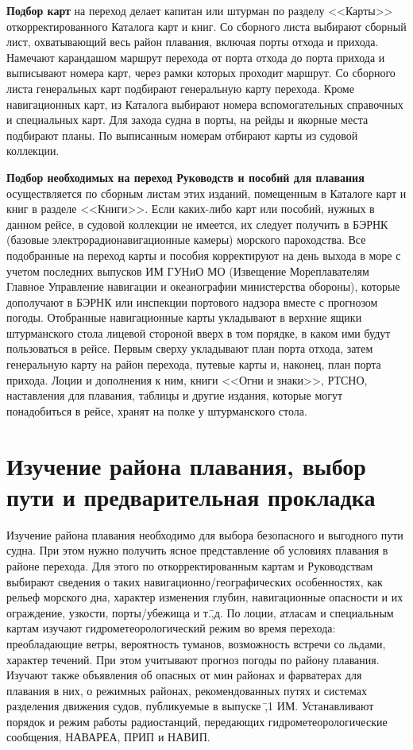 \textbf{Подбор карт} на переход делает капитан или штурман по разделу
<<Карты>> откорректированного Каталога карт и книг. Со сборного листа
выбирают сборный лист, охватывающий весь район плавания, включая порты
отхода и прихода. Намечают карандашом маршрут перехода от порта отхода
до порта прихода и выписывают номера карт, через рамки которых
проходит маршрут. Со сборного листа генеральных карт подбирают
генеральную карту перехода. Кроме навигационных карт, из Каталога
выбирают номера вспомогательных справочных и специальных карт. Для
захода судна в порты, на рейды и якорные места подбирают планы. По
выписанным номерам отбирают карты из судовой коллекции.

\textbf{Подбор необходимых на переход Руководств и пособий для
  плавания} осуществляется по сборным листам этих изданий, помещенным
в Каталоге карт и книг в разделе <<Книги>>. Если каких-либо карт или
пособий, нужных в данном рейсе, в судовой коллекции не имеется, их
следует получить в БЭРНК (базовые электрорадионавигационные камеры)
морского пароходства. Все подобранные на переход карты и пособия
корректируют на день выхода в море с учетом последних выпусков ИМ
ГУНиО МО (Извещение Мореплавателям Главное Управление навигации и
океанографии министерства обороны), которые дополучают в БЭРНК или
инспекции портового надзора вместе с прогнозом погоды. Отобранные
навигационные карты укладывают в верхние ящики штурманского стола
лицевой стороной вверх в том порядке, в каком ими будут пользоваться в
рейсе. Первым сверху укладывают план порта отхода, затем генеральную
карту на район перехода, путевые карты и, наконец, план порта
прихода. Лоции и дополнения к ним, книги <<Огни и знаки>>, РТСНО,
наставления для плавания, таблицы и другие издания, которые могут
понадобиться в рейсе, хранят на полке у штурманского стола.

\section{Изучение района плавания, выбор пути и предварительная прокладка}

Изучение района плавания необходимо для выбора безопасного и выгодного
пути судна. При этом нужно получить ясное представление об условиях
плавания в районе перехода. Для этого по откорректированным картам и
Руководствам выбирают сведения о таких навигационно\-/географических
особенностях, как рельеф морского дна, характер изменения глубин,
навигационные опасности и их ограждение, узкости, порты\-/убежища и
т.\=,д. По лоции, атласам и специальным картам изучают
гидрометеорологический режим во время перехода: преобладающие ветры,
вероятность туманов, возможность встречи со льдами, характер
течений. При этом учитывают прогноз погоды по району плавания. Изучают
также объявления об опасных от мин районах и фарватерах для плавания в
них, о режимных районах, рекомендованных путях и системах разделения
движения судов, публикуемые в выпуске \No\=,1 ИМ. Устанавливают
порядок и режим работы радиостанций, передающих гидрометеорологические
сообщения, НАВАРЕА, ПРИП и НАВИП.

